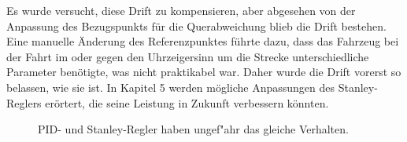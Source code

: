 \documentclass[arbeit=studie,oneside,BCOR=12mm]{ArbeitRST}
\begin{document}
Es wurde versucht, diese Drift zu kompensieren, aber abgesehen von der
Anpassung des Bezugspunkts für die Querabweichung blieb die Drift bestehen.
Eine manuelle Änderung des Referenzpunktes führte dazu, dass das Fahrzeug bei
der Fahrt im oder gegen den Uhrzeigersinn um die Strecke unterschiedliche
Parameter benötigte, was nicht praktikabel war. Daher wurde die Drift vorerst
so belassen, wie sie ist. In Kapitel 5 werden mögliche Anpassungen des
Stanley-Reglers erörtert, die seine Leistung in Zukunft verbessern könnten.

\begin{figure}[h]
    \centering
    \caption{PID- und Stanley-Regler haben ungef"ahr das gleiche Verhalten.}
    \label{ab:1.0}
\end{figure}
\end{document}
